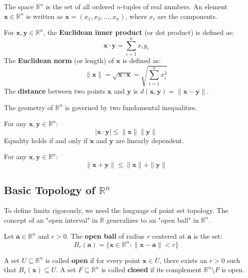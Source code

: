 \documentclass[oneside]{book}
\begin{document}
The space $\mathbb{R}^n$ is the set of all ordered $n$-tuples of real numbers. An element $\mathbf{x} \in \mathbb{R}^n$ is written as $\mathbf{x} = (x_1, x_2, \dots, x_n)$, where $x_i$ are the components.

\begin{definition}
For $\mathbf{x}, \mathbf{y} \in \mathbb{R}^n$, the \textbf{Euclidean inner product} (or dot product) is defined as:
\[ \mathbf{x} \cdot \mathbf{y} = \sum_{i=1}^n x_i y_i \]
The \textbf{Euclidean norm} (or length) of $\mathbf{x}$ is defined as:
\[ \|\mathbf{x}\| = \sqrt{\mathbf{x} \cdot \mathbf{x}} = \sqrt{\sum_{i=1}^n x_i^2} \]
The \textbf{distance} between two points $\mathbf{x}$ and $\mathbf{y}$ is $d(\mathbf{x}, \mathbf{y}) = \|\mathbf{x} - \mathbf{y}\|$.
\end{definition}

The geometry of $\mathbb{R}^n$ is governed by two fundamental inequalities.

\begin{theorem}
For any $\mathbf{x}, \mathbf{y} \in \mathbb{R}^n$:
\[ |\mathbf{x} \cdot \mathbf{y}| \le \|\mathbf{x}\| \|\mathbf{y}\| \]
Equality holds if and only if $\mathbf{x}$ and $\mathbf{y}$ are linearly dependent.
\end{theorem}

\begin{theorem}
For any $\mathbf{x}, \mathbf{y} \in \mathbb{R}^n$:
\[ \|\mathbf{x} + \mathbf{y}\| \le \|\mathbf{x}\| + \|\mathbf{y}\| \]
\end{theorem}

\subsection{Basic Topology of $\mathbb{R}^n$}

To define limits rigorously, we need the language of point set topology. The concept of an "open interval" in $\mathbb{R}$ generalizes to an "open ball" in $\mathbb{R}^n$.

\begin{definition}
Let $\mathbf{a} \in \mathbb{R}^n$ and $r > 0$. The \textbf{open ball} of radius $r$ centered at $\mathbf{a}$ is the set:
\[ B_r(\mathbf{a}) = \{ \mathbf{x} \in \mathbb{R}^n : \|\mathbf{x} - \mathbf{a}\| < r \} \]
\end{definition}

\begin{definition}
A set $U \subseteq \mathbb{R}^n$ is called \textbf{open} if for every point $\mathbf{x} \in U$, there exists an $r > 0$ such that $B_r(\mathbf{x}) \subseteq U$.
A set $F \subseteq \mathbb{R}^n$ is called \textbf{closed} if its complement $\mathbb{R}^n \setminus F$ is open.
\end{definition}
\end{document}
